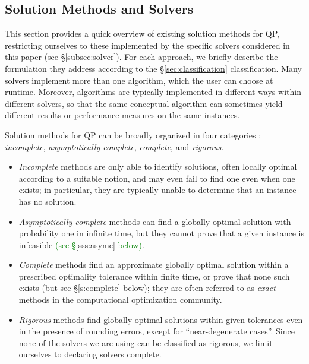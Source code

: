 
\subsection{Solution Methods and Solvers}\label{sec:algo}

This section provides a quick overview of existing solution methods for QP, restricting ourselves to these implemented by the specific solvers considered in this paper (see \S\ref{subsec:solver}). For each approach, we briefly describe the formulation they address according to the \S\ref{sec:classification} classification. Many solvers implement more than one algorithm, which the user can choose at runtime. Moreover, algorithms are typically implemented in different ways within different solvers, so that the same conceptual algorithm can sometimes yield different results or performance measures on the same instances.

  Solution methods for QP can be broadly organized in four categories \cite{neumaier}: \emph{incomplete}, \emph{asymptotically complete}, \emph{complete}, and \emph{rigorous}.
  \begin{itemize}
  \item \textit{Incomplete} methods are only able to identify solutions, often locally optimal according to a suitable notion, and may even fail to find one even when one exists; in particular, they are typically unable to determine that an instance has no solution.
  \item \textit{Asymptotically complete} methods can find a globally optimal solution with probability one in infinite time, but  they cannot prove that a given instance is infeasible \textcolor{green}{(see \S\ref{sss:asymc} below)}.
  \item \textit{Complete} methods find an approximate globally optimal solution within a prescribed optimality tolerance within finite time, or prove that none such exists (but see \S\ref{s:complete} below); they are often referred to as \emph{exact} methods in the computational optimization community.
  \item \textit{Rigorous} methods find globally optimal solutions within given tolerances even in the presence of rounding errors, except for ``near-degenerate cases''. Since none of the solvers we are using can be classified as rigorous, we limit ourselves to declaring solvers complete.
  \end{itemize}

